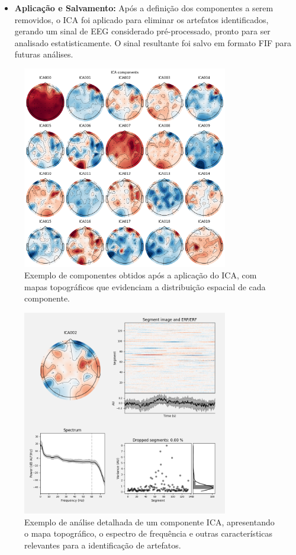 \begin{itemize}
    \item \textbf{Aplicação e Salvamento:} Após a definição dos componentes a serem removidos, o ICA foi aplicado para eliminar os artefatos identificados, gerando um sinal de EEG considerado pré-processado, pronto para ser analisado estatisticamente. O sinal resultante foi salvo em formato FIF para futuras análises.
\end{itemize}

\begin{figure}[htb]
    \centering
    \includegraphics[width=0.8\textwidth]{figs/1_preprocessamento_eeg/3_exemplo_compomentes_pos_ICA.png}
    \caption{Exemplo de componentes obtidos após a aplicação do ICA, com mapas topográficos que evidenciam a distribuição espacial de cada componente.}
    \label{fig:componentes_pos_ICA}
\end{figure}

\begin{figure}[htb]
    \centering
    \includegraphics[width=0.8\textwidth]{figs/1_preprocessamento_eeg/4_exemplo_ICA_component_analysis.png}
    \caption{Exemplo de análise detalhada de um componente ICA, apresentando o mapa topográfico, o espectro de frequência e outras características relevantes para a identificação de artefatos.}
    \label{fig:exemplo_ICA_component_analysis}
\end{figure}
